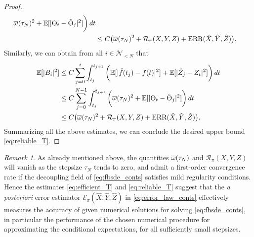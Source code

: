 \documentclass[11pt]{article}
\numberwithin{equation}{section}
\theoremstyle{definition}
\theoremstyle{remark}
\newtheorem{Remark}{Remark}[section]
\def\ol{\overline} \def\cl{\centerline}   \def\ul{\underline}
\def\l{\label}  \def\f{\frac}  \def\fa{\forall}
\def\cE{\mathcal{E}}
\def\cN{\mathcal{N}}
\def\cR{\mathcal{R}}
\def\sE{{\mathbb{E}}}
\newcommand{\err}{\textnormal{ERR}}
\begin{document}
\begin{proof}
\begin{align*}
\ol{\om}(\tau_N)^2+
\sE[|\Theta_t-\hat{\Theta}_{j}|^2]
  \bigg)\,dt 
 \\
 &\le  
 C\big(\ol{\om}(\tau_N)^2
+
\cR_\pi(X,Y,Z)
+\err(\hat{X},\hat{Y},\hat{Z})
\big).
\end{align*}
Similarly, we can obtain from all $i\in \cN_{<N}$ that
\begin{align*}
\sE[|B_i|^2]
&\le
C
\sum_{j=0}^i
\int_{t_j}^{t_{j+1}}
\bigg(
 \sE[
|\hat{f}(t_{j})-f(t)|^2]+\sE[|\hat{Z}_j-Z_t|^2]
  \bigg)\,dt 
  \\
 &\le
C
\sum_{j=0}^{N-1}
\int_{t_j}^{t_{j+1}}
\bigg(
\ol{\om}(\tau_N)^2+
 \sE[
|\Theta_t-\hat{\Theta}_{j}|^2]
  \bigg)\,dt 
 \\
 & \le
 C\big(\ol{\om}(\tau_N)^2
+
\cR_\pi(X,Y,Z)
+\err(\hat{X},\hat{Y},\hat{Z})
\big).
\end{align*}
Summarizing all the above estimates, 
we can conclude the desired upper bound  \eqref{eq:reliable_T}. 
\end{proof}

\begin{Remark}\l{eq:err_vanishing_R}
As already mentioned above, the quantities 
$\ol{\om}(\tau_N)$
and
$\cR_\pi(X,Y,Z)$
will vanish as the stepsize $\tau_N$ tends to zero,
and admit a first-order convergence rate if
the decoupling field of \eqref{eq:fbsde_conts}
satisfies mild regularity conditions.
Hence 
the estimates \eqref{eq:efficient_T} and 
\eqref{eq:reliable_T} suggest that 
the \textit{a posteriori} error estimator 
$\cE_\pi(\hat{X},\hat{Y},\hat{Z})$
in \eqref{eq:error_law_conts}
effectively measures 
the   accuracy of given numerical solutions for solving \eqref{eq:fbsde_conts},
in particular the performance of the chosen 
numerical procedure for approximating 
the conditional expectations, 
for all sufficiently small  stepsizes.
\end{Remark}
\end{document}
